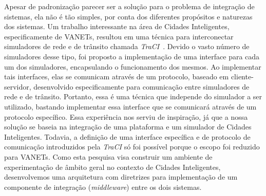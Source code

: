 Apesar de padronização parecer ser a solução para o problema de integração de sistemas, ela não é tão simples, por conta dos diferentes propósitos e naturezas dos sistemas.
Um trabalho interessante na área de Cidades Inteligentes, especificamente de VANETs, resultou em uma técnica para interconectar simuladores de rede e de trânsito chamada \textit{TraCI}~\citep{wegener_2008}.
Devido o vasto número de simuladores desse tipo, foi proposto a implementação de uma interface para cada um dos simuladores, encapsulando o funcionamento dos mesmos.
Ao implementar tais interfaces, elas se comunicam através de um protocolo, baseado em cliente-servidor, desenvolvido especificamente para comunicação entre simuladores de rede e de trânsito.
Portanto, essa é uma técnica que independe do simulador a ser utilizado, bastando implementar essa interface que se comunicará através de um protocolo específico.
Essa experiência nos serviu de inspiração, já que a nossa solução se baseia na integração de uma plataforma e um simulador de Cidades Inteligentes.
Todavia, a definição de uma interface específica e de protocolo de comunicação introduzidos pela \textit{TraCI} só foi possível porque o escopo foi reduzido para VANETs.
Como esta pesquisa visa construir um ambiente de experimentação de âmbito geral no contexto de Cidades Inteligentes, desenvolvemos uma arquitetura com diretrizes para implementação de um
componente de integração (\textit{middleware}) entre os dois sistemas.

